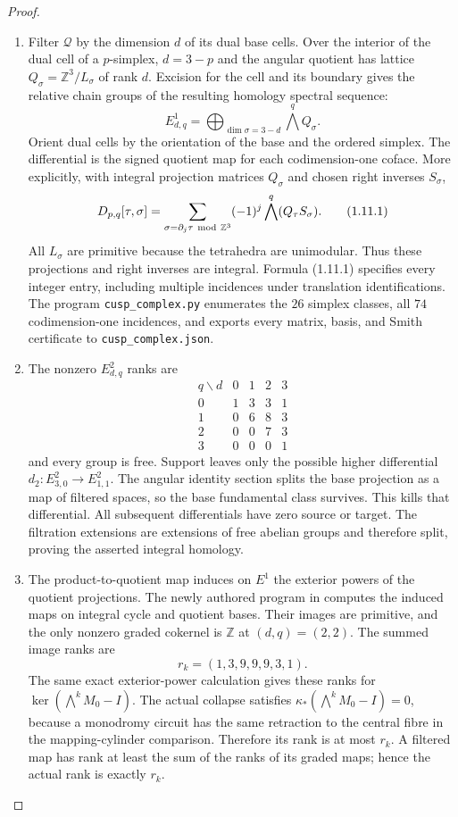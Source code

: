 \begin{proof}
\begin{enumerate}[label=\arabic*.]
\item Filter $\mathcal Q$ by the dimension $d$ of its dual base cells.
Over the interior of the dual cell of a $p$-simplex, $d=3-p$ and the
angular quotient has lattice
$Q_\sigma=\mathbb Z^3/L_\sigma$ of rank $d$.
Excision for the cell and its boundary gives the relative chain
groups of the resulting homology spectral sequence:
\[
E^1_{d,q}=\bigoplus_{\dim\sigma=3-d}\bigwedge^qQ_\sigma.
\]
Orient dual cells by the orientation of the base and the ordered
simplex.  The differential is the signed quotient map for each
codimension-one coface.  More explicitly, with integral projection
matrices $Q_\sigma$ and chosen right inverses $S_\sigma$,
\[
D_{p,q}[\tau,\sigma]=
 \sum_{\sigma=\partial_j\tau\ {\rm mod}\ \mathbb Z^3}
 (-1)^j\bigwedge^q(Q_\tau S_\sigma).
\tag{1.11.1}
\]
All $L_\sigma$ are primitive because the tetrahedra are unimodular.
Thus these projections and right inverses are integral.  Formula
(1.11.1) specifies every integer entry, including multiple incidences
under translation identifications.  The program
\texttt{cusp\_complex.py} enumerates the $26$ simplex classes, all
$74$ codimension-one incidences, and exports every matrix, basis, and
Smith certificate to \texttt{cusp\_complex.json}.

\item The nonzero $E^2_{d,q}$ ranks are
\[
\begin{array}{c|rrrr}
q\backslash d&0&1&2&3\\\hline
0&1&3&3&1\\
1&0&6&8&3\\
2&0&0&7&3\\
3&0&0&0&1
\end{array}
\]
and every group is free.  Support leaves only the possible higher
differential $d_2:E^2_{3,0}\to E^2_{1,1}$.
The angular identity section splits the base projection as a map of
filtered spaces, so the base fundamental class survives.  This kills
that differential.  All subsequent differentials have zero source or
target.  The filtration extensions are extensions of free abelian
groups and therefore split, proving the asserted integral homology.

\item The product-to-quotient map induces on $E^1$ the exterior powers of
the quotient projections.  The newly authored program
 in 
computes the induced maps on integral cycle and quotient bases.
Their images are primitive, and the only nonzero graded cokernel
is $\mathbb Z$ at $(d,q)=(2,2)$.  The summed image ranks are
\[
             r_k=(1,3,9,9,9,3,1).
\]
The same exact exterior-power calculation gives these ranks for
$\ker(\bigwedge^kM_0-I)$.
The actual collapse satisfies
$\kappa_*(\bigwedge^kM_0-I)=0$, because a monodromy circuit
has the same retraction to the central fibre in the mapping-cylinder
comparison.  Therefore its rank is at most $r_k$.
A filtered map has rank at least the sum of the ranks of its
graded maps; hence the actual rank is exactly $r_k$.


\end{enumerate}
\end{proof}
